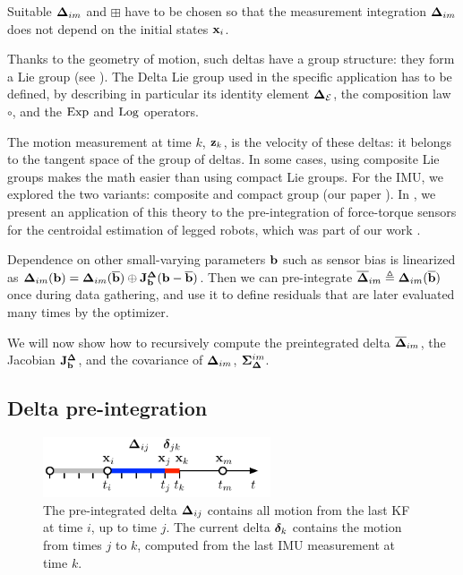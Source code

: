 Suitable ${\bm \Delta}_{im}$ and $\boxplus$ have to be chosen so that the measurement integration ${\bm \Delta}_{im}$ does not depend on the initial states ${\bf x}_i$.

Thanks to the geometry of motion, such deltas have a group structure: they form a Lie group (see ).
The Delta Lie group used in the specific application has to be defined, by describing in particular its identity element ${\bm \Delta}_{\mathcal{E}}$, the composition law $\circ$, and the $\operatorname*{Exp}$ and $\operatorname*{Log}$ operators.


The motion measurement at time $k$, ${\bf z}_k$, is the velocity of these deltas: it belongs to the tangent space of the group of deltas. 
In some cases, using composite Lie groups makes the math easier than using compact Lie groups. For the IMU, we explored the two variants: composite \cite{forster2015imu} and compact group (our paper \cite{fourmy2019absolute}). In , we present an application of this theory to the pre-integration of force-torque sensors for the centroidal estimation of legged robots, which was part of our work \cite{fourmy2021contact}.

Dependence on other small-varying parameters ${\bf b}$ such as sensor bias is linearized as ${\bm \Delta}_{im}({\bf b})={\bm \Delta}_{im}(\overline{{\bf b}}) \oplus {\bf J}^{\bm \Delta}_{\bf b}({\bf b}-\overline{{\bf b}})$.
Then we can pre-integrate $\overline{{\bm \Delta}}_{im}\triangleq{\bm \Delta}_{im}(\overline{{\bf b}})$ once during data gathering, and use it to define residuals that are later evaluated many times by the optimizer. 

We will now show how to recursively compute the preintegrated delta $\overline{{\bm \Delta}}_{im}$, the Jacobian ${\bf J}^{\bm \Delta}_{\bf b}$, and the covariance of ${\bm \Delta}_{im}$, ${\bm \Sigma}_{{\bm \Delta}}^{im}$.




\subsection{Delta pre-integration}

\begin{figure}[tb]
    \centering
    \includegraphics[width=0.6\textwidth]{figures/delta_time}
    \caption{The pre-integrated delta ${\bm \Delta}_{ij}$ contains all motion from the last KF at time $i$, up to time $j$. 
    The current delta ${\bm \delta}_k$ contains the motion from times $j$ to $k$, computed from the last IMU measurement at time $k$.}
    \label{fig:delta_time}
\end{figure}

